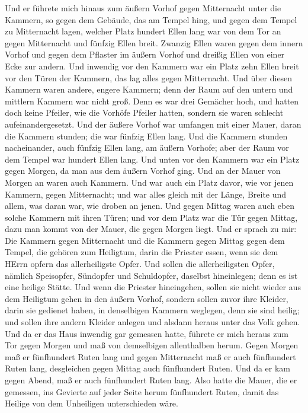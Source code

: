 Und er führete mich hinaus zum äußern Vorhof gegen
Mitternacht unter die Kammern, so gegen dem Gebäude, das am Tempel hing,
und gegen dem Tempel zu Mitternacht lagen,  welcher Platz
hundert Ellen lang war von dem Tor an gegen Mitternacht und fünfzig
Ellen breit.  Zwanzig Ellen waren gegen dem innern Vorhof
und gegen dem Pflaster im äußern Vorhof und dreißig Ellen von einer Ecke
zur andern.  Und inwendig vor den Kammern war ein Platz zehn
Ellen breit vor den Türen der Kammern, das lag alles gegen Mitternacht.
 Und über diesen Kammern waren andere, engere Kammern; denn
der Raum auf den untern und mittlern Kammern war nicht groß.
 Denn es war drei Gemächer hoch, und hatten doch keine
Pfeiler, wie die Vorhöfe Pfeiler hatten, sondern sie waren schlecht
aufeinandergesetzt.  Und der äußere Vorhof war umfangen mit
einer Mauer, daran die Kammern stunden; die war fünfzig Ellen lang.
 Und die Kammern stunden nacheinander, auch fünfzig Ellen
lang, am äußern Vorhofe; aber der Raum vor dem Tempel war hundert Ellen
lang.  Und unten vor den Kammern war ein Platz gegen Morgen,
da man aus dem äußern Vorhof ging.  Und an der Mauer von
Morgen an waren auch Kammern.  Und war auch ein Platz
davor, wie vor jenen Kammern, gegen Mitternacht; und war alles gleich
mit der Länge, Breite und allem, was daran war, wie droben an jenen.
 Und gegen Mittag waren auch eben solche Kammern mit ihren
Türen; und vor dem Platz war die Tür gegen Mittag, dazu man kommt von
der Mauer, die gegen Morgen liegt.  Und er sprach zu mir:
Die Kammern gegen Mitternacht und die Kammern gegen Mittag gegen dem
Tempel, die gehören zum Heiligtum, darin die Priester essen, wenn sie
dem HErrn opfern das allerheiligste Opfer. Und sollen die
allerheiligsten Opfer, nämlich Speisopfer, Sündopfer und Schuldopfer,
daselbst hineinlegen; denn es ist eine heilige Stätte.  Und
wenn die Priester hineingehen, sollen sie nicht wieder aus dem Heiligtum
gehen in den äußern Vorhof, sondern sollen zuvor ihre Kleider, darin sie
gedienet haben, in denselbigen Kammern weglegen, denn sie sind heilig;
und sollen ihre andern Kleider anlegen und alsdann heraus unter das Volk
gehen.  Und da er das Haus inwendig gar gemessen hatte,
führete er mich heraus zum Tor gegen Morgen und maß von demselbigen
allenthalben herum.  Gegen Morgen maß er fünfhundert Ruten
lang  und gegen Mitternacht maß er auch fünfhundert Ruten
lang,  desgleichen gegen Mittag auch fünfhundert Ruten.
 Und da er kam gegen Abend, maß er auch fünfhundert Ruten
lang.  Also hatte die Mauer, die er gemessen, ins Gevierte
auf jeder Seite herum fünfhundert Ruten, damit das Heilige von dem
Unheiligen unterschieden wäre.


